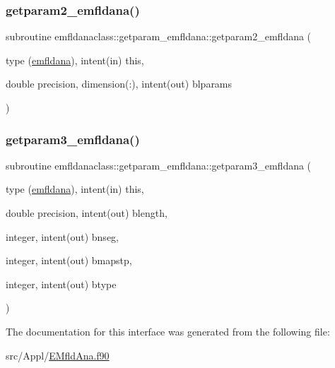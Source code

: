 \mbox{\label{interfaceemfldanaclass_1_1getparam__emfldana_a24ba6af7abb3d1f169817637b36b69ac}} 
\subsubsection{\texorpdfstring{getparam2\_emfldana()}{getparam2\_emfldana()}}
{\footnotesize\ttfamily subroutine emfldanaclass\+::getparam\+\_\+emfldana\+::getparam2\+\_\+emfldana (\begin{DoxyParamCaption}\item[{type (\mbox{\hyperlink{namespaceemfldanaclass_structemfldanaclass_1_1emfldana}{emfldana}}), intent(in)}]{this,  }\item[{double precision, dimension(\+:), intent(out)}]{blparams }\end{DoxyParamCaption})}

\mbox{\label{interfaceemfldanaclass_1_1getparam__emfldana_a2ca4b47a02fed29443c167ee8f63e0f2}} 
\subsubsection{\texorpdfstring{getparam3\_emfldana()}{getparam3\_emfldana()}}
{\footnotesize\ttfamily subroutine emfldanaclass\+::getparam\+\_\+emfldana\+::getparam3\+\_\+emfldana (\begin{DoxyParamCaption}\item[{type (\mbox{\hyperlink{namespaceemfldanaclass_structemfldanaclass_1_1emfldana}{emfldana}}), intent(in)}]{this,  }\item[{double precision, intent(out)}]{blength,  }\item[{integer, intent(out)}]{bnseg,  }\item[{integer, intent(out)}]{bmapstp,  }\item[{integer, intent(out)}]{btype }\end{DoxyParamCaption})}



The documentation for this interface was generated from the following file\+:\begin{DoxyCompactItemize}
\item 
src/\+Appl/\mbox{\hyperlink{_e_mfld_ana_8f90}{E\+Mfld\+Ana.\+f90}}\end{DoxyCompactItemize}
